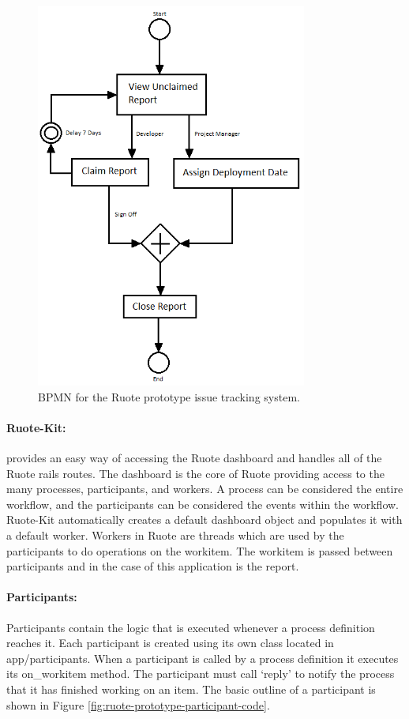 \begin{figure}[!ht]
\centering \includegraphics[height=5in]{./img/prototypes/ruote-bpmn-diagram}
\caption{BPMN for the Ruote prototype issue tracking system.}
\label{fig:ruote-bpmn-diagram}
\end{figure}

\paragraph{Ruote-Kit:} provides an easy way of accessing the Ruote dashboard and handles all of the Ruote rails routes. The dashboard is the core of Ruote providing access to the many processes, participants, and workers. A process can be considered the entire workflow, and the participants can be considered the events within the workflow. Ruote-Kit automatically creates a default dashboard object and populates it with a default worker. Workers in Ruote are threads which are used by the participants to do operations on the workitem. The workitem is passed between participants and in the case of this application is the report.

\paragraph{Participants:} Participants contain the logic that is executed whenever a process definition reaches it. Each participant is created using its own class located in app/participants. When a participant is called by a process definition it executes its on\_workitem method. The participant must call ‘reply’ to notify the process that it has finished working on an item. The basic outline of a participant is shown in Figure \ref{fig:ruote-prototype-participant-code}.

